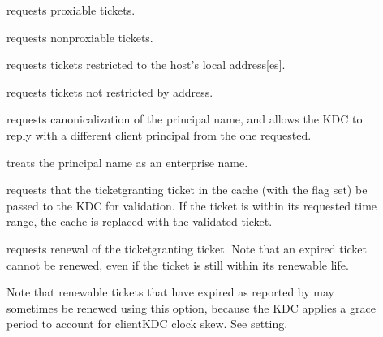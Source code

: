 \documentclass[letterpaper,10pt,english]{sphinxmanual}
\begin{document}
\begin{description}
\item[{}] \leavevmode
\sphinxAtStartPar
requests proxiable tickets.

\item[{}] \leavevmode
\sphinxAtStartPar
requests non\sphinxhyphen{}proxiable tickets.

\item[{}] \leavevmode
\sphinxAtStartPar
requests tickets restricted to the host’s local address{[}es{]}.

\item[{}] \leavevmode
\sphinxAtStartPar
requests tickets not restricted by address.

\item[{}] \leavevmode
\sphinxAtStartPar
requests canonicalization of the principal name, and allows the
KDC to reply with a different client principal from the one
requested.

\item[{}] \leavevmode
\sphinxAtStartPar
treats the principal name as an enterprise name.

\item[{}] \leavevmode
\sphinxAtStartPar
requests that the ticket\sphinxhyphen{}granting ticket in the cache (with the
 flag set) be passed to the KDC for validation.  If the
ticket is within its requested time range, the cache is replaced
with the validated ticket.

\item[{}] \leavevmode
\sphinxAtStartPar
requests renewal of the ticket\sphinxhyphen{}granting ticket.  Note that an
expired ticket cannot be renewed, even if the ticket is still
within its renewable life.

\sphinxAtStartPar
Note that renewable tickets that have expired as reported by
{\hyperref[\detokenize{user/user_commands/klist:klist-1}]{}} may sometimes be renewed using this option,
because the KDC applies a grace period to account for client\sphinxhyphen{}KDC
clock skew.  See   setting.


\end{description}
\end{document}
